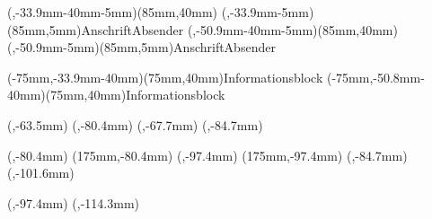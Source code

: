 {{		\boxA(\linksKopf,-33.9mm-40mm-5mm)(85mm,40mm){\anschrift}
		\boxA(\linksKopf,-33.9mm-5mm)(85mm,5mm){AnschriftAbsender}
		\boxB(\linksKopf,-50.9mm-40mm-5mm)(85mm,40mm){\anschrift}
		\boxB(\linksKopf,-50.9mm-5mm)(85mm,5mm){AnschriftAbsender}

		\boxA(\paperwidth-10mm-75mm,-33.9mm-40mm)(75mm,40mm){Informationsblock} %
		\boxB(\paperwidth-10mm-75mm,-50.8mm-40mm)(75mm,40mm){Informationsblock} %
		
		\markA(\linksKopf,-63.5mm)
		\markB(\linksKopf,-80.4mm)
		\markA(\linksKopf,-67.7mm)
		\markB(\linksKopf,-84.7mm)
		
		\markA(\linksStd,-80.4mm)	%
		\markA(175mm,-80.4mm)	%
		\markB(\linksStd,-97.4mm)	%
		\markB(175mm,-97.4mm)	%
		\markA(\linksStd,-84.7mm)
		\markB(\linksStd,-101.6mm)
		
		\markA(\linksStd,-97.4mm)
		\markB(\linksStd,-114.3mm)
	}%
  
	\AtTextCenter{
	}%
	\AtPageLowerLeft{%
	}%
}
